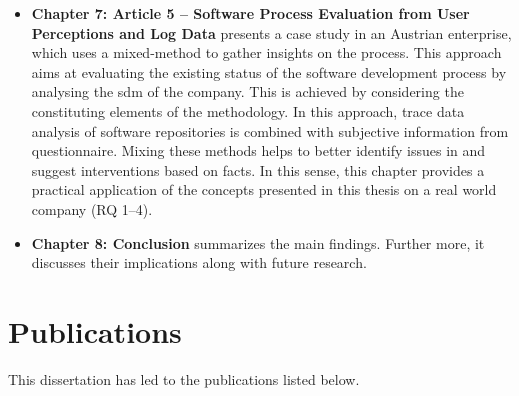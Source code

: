 \begin{itemize}
	\item \textbf{Chapter 7: Article 5 -- Software Process Evaluation from User Perceptions and Log Data} presents a case study in an Austrian enterprise, which uses a mixed-method to gather insights on the process. This approach aims at evaluating the existing status of the software development process by analysing the \gls{sdm} of the company. This is achieved by considering the constituting elements of the methodology. In this approach, trace data analysis of software repositories is combined with subjective information from questionnaire. Mixing these methods helps to better identify issues in and suggest interventions based on facts. In this sense, this chapter provides a practical application of the concepts presented in this thesis on a real world company (RQ 1--4).
	
	\item \textbf{Chapter 8: Conclusion} summarizes the main findings. Further more, it discusses their implications along with future research. 
	 	
\end{itemize}


\section{Publications}
\label{sec:intro-related-publications}

This dissertation has led to the publications listed below.\\

